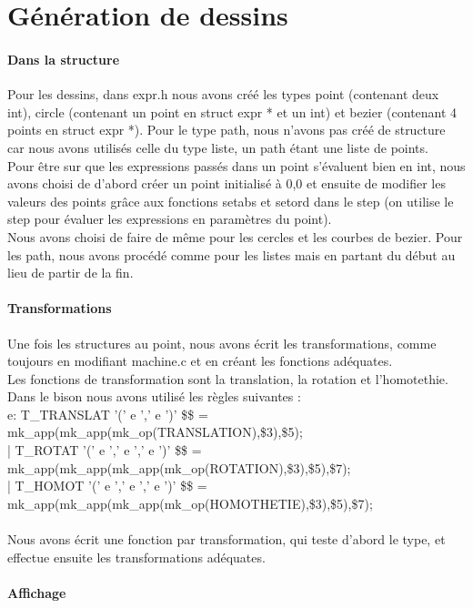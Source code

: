 \documentclass{report}
\begin{document}
\part{Génération de dessins}
\subsection{Dans la structure}

Pour les dessins, dans expr.h nous avons créé les types point (contenant deux int), circle (contenant un point en struct expr * et un int) et bezier (contenant 4 points en struct expr *). Pour le type path, nous n'avons pas créé de structure car nous avons utilisés celle du type liste, un path étant une liste de points.\\
Pour être sur que les expressions passés dans un point s'évaluent bien en int, nous avons choisi de d'abord créer un point initialisé à {0,0} et ensuite de modifier les valeurs des points grâce aux fonctions setabs et setord dans le step (on utilise le step pour évaluer les expressions en paramètres du point).\\
Nous avons choisi de faire de même pour les cercles et les courbes de bezier. Pour les path, nous avons procédé comme pour les listes mais en partant du début au lieu de partir de la fin.

\subsection{Transformations}

Une fois les structures au point, nous avons écrit les transformations, comme toujours en modifiant machine.c et en créant les fonctions adéquates.\\
Les fonctions de transformation sont la translation, la rotation et l'homotethie. Dans le bison nous avons utilisé les règles suivantes :\\
e: T_TRANSLAT '(' e ',' e ')'    {\$\$ = mk_app(mk_app(mk_op(TRANSLATION),\$3),\$5);}\\
|  T_ROTAT '(' e ',' e ',' e ')' {\$\$ = mk_app(mk_app(mk_app(mk_op(ROTATION),\$3),\$5),\$7);}\\
|  T_HOMOT '(' e ',' e ',' e ')' {\$\$ = mk_app(mk_app(mk_app(mk_op(HOMOTHETIE),\$3),\$5),\$7);}\\
\\
Nous avons écrit une fonction par transformation, qui teste d'abord le type, et effectue ensuite les transformations adéquates.

\subsection{Affichage}
\end{document}
